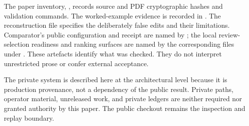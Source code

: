 \documentclass[10pt]{article}
\begin{document}
The paper inventory, , records source
and PDF cryptographic hashes and validation commands. The worked-example evidence is recorded in
. The reconstruction file
 specifies the deliberately false
edits and their limitations. Comparator's public configuration and receipt are
named by ; the local review-selection readiness and
ranking surfaces are named by the corresponding files under .
These artefacts identify what was checked. They do not interpret unrestricted
prose or confer external acceptance.

The private system is described here at the architectural level because it is
production provenance, not a dependency of the public result. Private paths,
operator material, unreleased work, and private ledgers are neither required
nor granted authority by this paper. The public checkout remains the inspection
and replay boundary.
\end{document}

